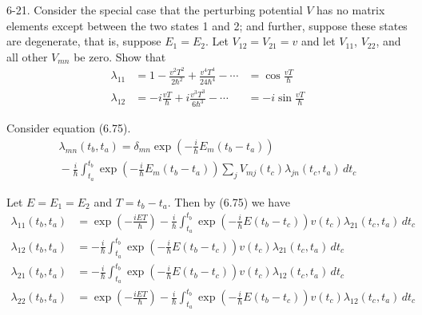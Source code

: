 \documentclass[12pt]{article}
\begin{document}
6-21.
Consider the special case that the perturbing potential
$V$ has no matrix elements except between the two states
1 and 2; and further, suppose these states are degenerate,
that is, suppose $E_1=E_2$.
Let $V_{12}=V_{21} = v$ and let $V_{11}$, $V_{22}$, and
all other $V_{mn}$ be zero.
Show that
\begin{align*}
\lambda_{11}&=1-\frac{v^2T^2}{2\hbar^2}+\frac{v^4T^4}{24\hbar^4}-\cdots&=\cos\frac{vT}{\hbar}
\tag{6.81}
\\
\lambda_{12}&=-i\frac{vT}{\hbar}+i\frac{v^3T^3}{6\hbar^3}-\cdots&=-i\sin\frac{vT}{\hbar}
\tag{6.82}
\end{align*}

Consider equation (6.75).
\begin{multline*}
\lambda_{mn}(t_b,t_a)=\delta_{mn}
\exp\left(-\frac{i}{\hbar}E_m(t_b-t_a)\right)
\\
{}-\frac{i}{\hbar}
\int_{t_a}^{t_b}
\exp\left(-\frac{i}{\hbar}E_m(t_b-t_a)\right)
\sum_jV_{mj}(t_c)\lambda_{jn}(t_c,t_a)\,dt_c
\tag{6.75}
\end{multline*}

Let $E=E_1=E_2$ and $T=t_b-t_a$.
Then by (6.75) we have
\begin{align*}
\lambda_{11}(t_b,t_a)&=
\exp\left(-\frac{iET}{\hbar}\right)
-\frac{i}{\hbar}
\int_{t_a}^{t_b}
\exp\left(-\frac{i}{\hbar}E(t_b-t_c)\right)
v(t_c)\lambda_{21}(t_c,t_a)\,dt_c
\\
\lambda_{12}(t_b,t_a)&=
-\frac{i}{\hbar}
\int_{t_a}^{t_b}
\exp\left(-\frac{i}{\hbar}E(t_b-t_c)\right)
v(t_c)\lambda_{21}(t_c,t_a)\,dt_c
\\
\lambda_{21}(t_b,t_a)&=
-\frac{i}{\hbar}
\int_{t_a}^{t_b}
\exp\left(-\frac{i}{\hbar}E(t_b-t_c)\right)
v(t_c)\lambda_{12}(t_c,t_a)\,dt_c
\\
\lambda_{22}(t_b,t_a)&=
\exp\left(-\frac{iET}{\hbar}\right)
-\frac{i}{\hbar}
\int_{t_a}^{t_b}
\exp\left(-\frac{i}{\hbar}E(t_b-t_c)\right)
v(t_c)\lambda_{12}(t_c,t_a)\,dt_c
\end{align*}
\end{document}
